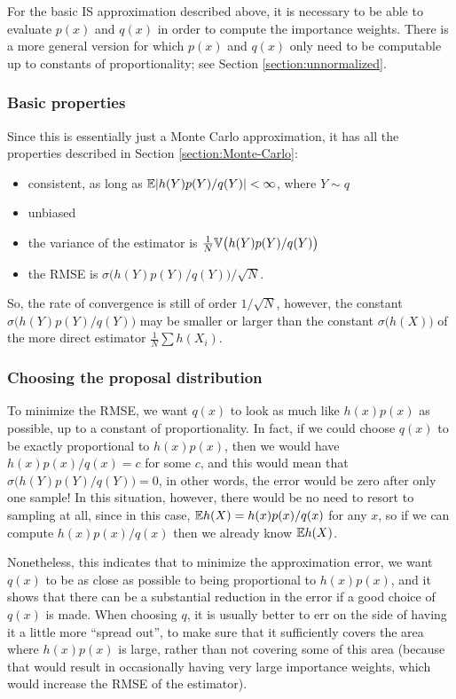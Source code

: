 \documentclass[12pt]{article}
\begin{document}
For the basic IS approximation described above, it is necessary to be able to evaluate $p(x)$ and $q(x)$ in order to compute the importance weights.  There is a more general version for which $p(x)$ and $q(x)$ only need to be computable up to constants of proportionality; see Section \ref{section:unnormalized}.

\subsubsection{Basic properties}
Since this is essentially just a Monte Carlo approximation, it has all the properties described in Section \ref{section:Monte-Carlo}: 
\begin{itemize}
\item consistent, as long as $\mathbb{E}|h(Y) p(Y)/q(Y)|<\infty$, where $Y \sim q$
\item unbiased
\item the variance of the estimator is $\frac{1}{N}\mathbb{V}\big(h(Y) p(Y)/q(Y)\big)$
\item the RMSE is $\sigma\big(h(Y)p(Y)/q(Y)\big)/{\sqrt N}$.
\end{itemize}
So, the rate of convergence is still of order $1/\sqrt N$, however, the constant $\sigma\big(h(Y)p(Y)/q(Y)\big)$ may be smaller or larger than the constant $\sigma\big(h(X)\big)$ of the more direct estimator $\frac{1}{N}\sum h(X_i)$.

\subsubsection{Choosing the proposal distribution}
\label{section:choosing-q}
To minimize the RMSE, we want $q(x)$ to look as much like $h(x)p(x)$ as possible, up to a constant of proportionality. In fact, if we could choose $q(x)$ to be exactly proportional to $h(x)p(x)$, then we would have $h(x)p(x)/q(x)=c$ for some $c$, and this would mean that $\sigma\big(h(Y)p(Y)/q(Y)\big)=0$, in other words, the error would be zero after only one sample!  In this situation, however, there would be no need to resort to sampling at all, since in this case, $\mathbb{E} h(X) = h(x)p(x)/q(x)$ for any $x$, so if we can compute $h(x)p(x)/q(x)$ then we already know $\mathbb{E} h(X)$.

Nonetheless, this indicates that to minimize the approximation error, we want $q(x)$ to be as close as possible to being proportional to $h(x) p(x)$, and it shows that there can be a substantial reduction in the error if a good choice of $q(x)$ is made. When choosing $q$, it is usually better to err on the side of having it a little more ``spread out'', to make sure that it sufficiently covers the area where $h(x) p(x)$ is large, rather than not covering some of this area (because that would result in occasionally having very large importance weights, which would increase the RMSE of the estimator).
\end{document}

